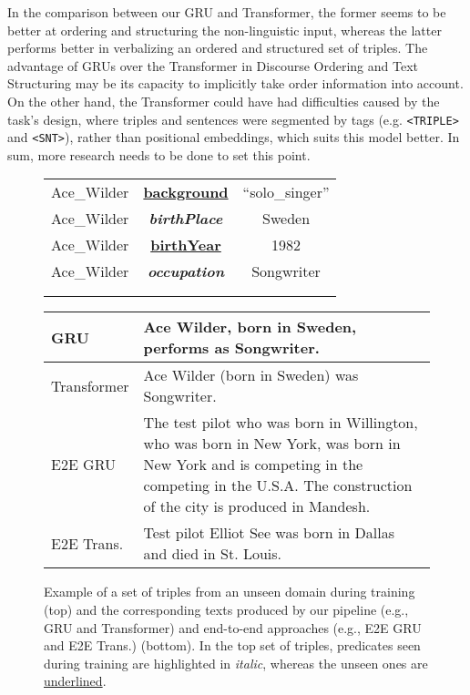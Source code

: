 \documentclass[11pt,a4paper]{article}
\begin{document}
In the comparison between our GRU and Transformer, the former seems to be better at ordering and structuring the non-linguistic input, whereas the latter performs better in verbalizing an ordered and structured set of triples. The advantage of GRUs over the Transformer in Discourse Ordering and Text Structuring may be its capacity to implicitly take order information into account. On the other hand, the Transformer could have had difficulties caused by the task's design, where triples and sentences were segmented by tags (e.g. \texttt{<TRIPLE>} and \texttt{<SNT>}), rather than positional embeddings, which suits this model better. In sum, more research needs to be done to set this point.



\begin{figure*}
\footnotesize{
\begin{center}

\begin{tabular}{c c c}
Ace\_Wilder & \underline{\textbf{background}} & ``solo\_singer'' \\
Ace\_Wilder & \textit{\textbf{birthPlace}} & Sweden \\
Ace\_Wilder & \underline{\textbf{birthYear}} & 1982  \\
Ace\_Wilder & \textit{\textbf{occupation}} & Songwriter  \\
&  &   \\
 &  &   \\
\end{tabular}

{\def\arraystretch{2}\tabcolsep=10pt
\begin{tabular}{l L}
GRU         & Ace Wilder, born in Sweden, performs as Songwriter. \\ \hline
Transformer & Ace Wilder (born in Sweden) was Songwriter. \\
\hline 
E2E GRU     & The test pilot who was born in Willington, who was born in New York, was born in New York and is competing in the competing in the U.S.A. The construction of the city is produced in Mandesh. \\
\hline
E2E Trans. &  Test pilot Elliot See was born in Dallas and died in St. Louis.
\end{tabular}}
\end{center}
\caption{Example of a set of triples from an unseen domain during training (top) and the corresponding texts produced by our pipeline (e.g., GRU and Transformer) and end-to-end approaches (e.g., E2E GRU and E2E Trans.) (bottom). In the top set of triples, predicates seen during training are highlighted in \textit{italic}, whereas the unseen ones are \underline{underlined}.}
\label{fig:example}
}
\end{figure*}
\end{document}
